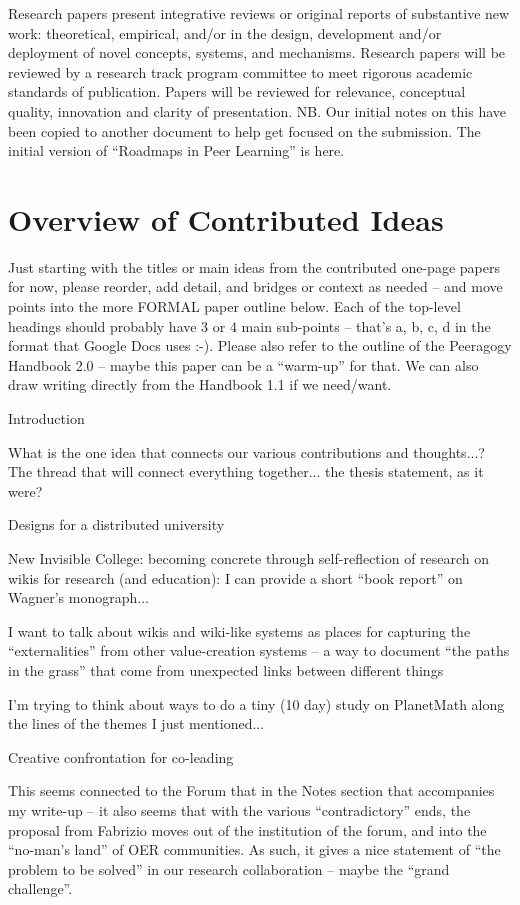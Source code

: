 \documentclass{acm_proc_article-sp}
\begin{document}
Research papers present integrative reviews or original reports of substantive new work: theoretical, empirical, and/or in the design, development and/or deployment of novel concepts, systems, and mechanisms. Research papers will be reviewed by a research track program committee to meet rigorous academic standards of publication. Papers will be reviewed for relevance, conceptual quality, innovation and clarity of presentation.
NB. Our initial notes on this have been copied to another document to help get focused on the submission. The initial version of ``Roadmaps in Peer Learning'' is here.

\section{Overview of Contributed Ideas}

Just starting with the titles or main ideas from the contributed one-page papers for now, please reorder, add detail, and bridges or context as needed -- and move points into the more FORMAL paper outline below. Each of the top-level headings should probably have 3 or 4 main sub-points -- that's a, b, c, d in the format that Google Docs uses :-). Please also refer to the outline of the Peeragogy Handbook 2.0 -- maybe this paper can be a ``warm-up'' for that. We can also draw writing directly from the Handbook 1.1 if we need/want.

    Introduction

        What is the one idea that connects our various contributions and thoughts...? The thread that will connect everything together... the thesis statement, as it were?

    Designs for a distributed university

        New Invisible College: becoming concrete through self-reflection of research on wikis for research (and education): I can provide a short ``book report'' on Wagner's monograph...

        I want to talk about wikis and wiki-like systems as places for capturing the ``externalities'' from other value-creation systems -- a way to document ``the paths in the grass'' that come from unexpected links between different things

        I'm trying to think about ways to do a tiny (10 day) study on PlanetMath along the lines of the themes I just mentioned...

    Creative confrontation for co-leading

        This seems connected to the Forum that in the Notes section that accompanies my write-up -- it also seems that with the various ``contradictory'' ends, the proposal from Fabrizio moves out of the institution of the forum, and into the ``no-man's land'' of OER communities. As such, it gives a nice statement of ``the problem to be solved'' in our research collaboration -- maybe the ``grand challenge''.
\end{document}
